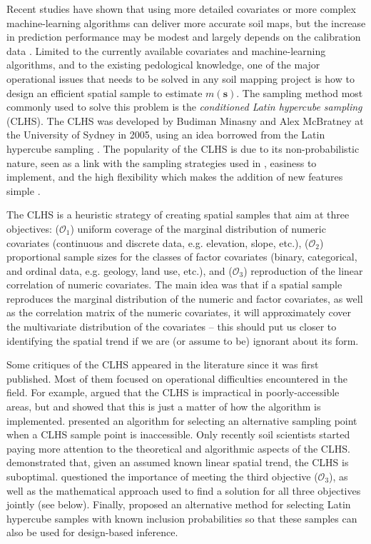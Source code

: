 Recent studies have shown that using more detailed covariates or more complex machine-learning algorithms can 
deliver more accurate soil maps, but the increase in prediction performance may be modest 
\cite{Samuel-RosaEtAl2015} and largely depends on the calibration data \cite{HeungEtAl2016}. Limited to the 
currently available covariates and machine-learning algorithms, and to the existing pedological knowledge, one 
of the major operational issues that needs to be solved in any soil mapping project is how to design an 
efficient spatial sample to estimate $m(\boldsymbol{s})$. The sampling method most commonly used to solve this 
problem is the \emph{conditioned Latin hypercube sampling} (CLHS). The CLHS was developed by Budiman Minasny 
and Alex McBratney at the University of Sydney in 2005, using an idea borrowed from the Latin hypercube 
sampling \cite{McKayEtAl1979, MinasnyEtAl2006b}. The popularity of the CLHS is due to its non-probabilistic 
nature, seen as a link with the sampling strategies used in , easiness to 
implement, and the high flexibility which makes the addition of new features simple \cite{MinasnyEtAl2010a, 
RoudierEtAl2012, MulderEtAl2013, CarvalhoJuniorEtAl2014, CliffordEtAl2014}.

The CLHS is a heuristic strategy of creating spatial samples that aim at three objectives: ($\mathcal{O}_1$) 
uniform coverage of the marginal distribution of numeric covariates (continuous and discrete data, e.g. 
elevation, slope, etc.), ($\mathcal{O}_2$) proportional sample sizes for the classes of factor covariates 
(binary, categorical, and ordinal data, e.g. geology, land use, etc.), and ($\mathcal{O}_3$) reproduction of 
the linear correlation of numeric covariates. The main idea was that if a spatial sample reproduces the 
marginal distribution of the numeric and factor covariates, as well as the correlation matrix of the numeric 
covariates, it will approximately cover the multivariate distribution of the covariates -- this should put us 
closer to identifying the  spatial trend if we are (or assume to be) ignorant about its form.

Some critiques of the CLHS appeared in the literature since it was first published. Most of them focused on 
operational difficulties encountered in the field. For example, \citet{CambuleEtAl2013} argued that the 
CLHS is impractical in poorly-accessible areas, but \citet{RoudierEtAl2012} and 
\citet{MulderEtAl2013} showed that this is just a matter of how the algorithm is implemented.
\citet{CliffordEtAl2014} presented an algorithm for selecting an alternative sampling point when a CLHS 
sample point is inaccessible. Only recently soil scientists started paying more attention to the theoretical 
and algorithmic aspects of the CLHS. \citet{MinasnyEtAl2010a} demonstrated that, given an assumed known 
linear spatial trend, the CLHS is suboptimal. \citet{CliffordEtAl2014} questioned the importance of 
meeting the third objective ($\mathcal{O}_3$), as well as the mathematical approach used to find a solution 
for all three objectives jointly (see below). Finally, \citet{Brus2015} proposed an alternative method 
for selecting Latin hypercube samples with known inclusion probabilities so that these samples can also be 
used for design-based inference.


